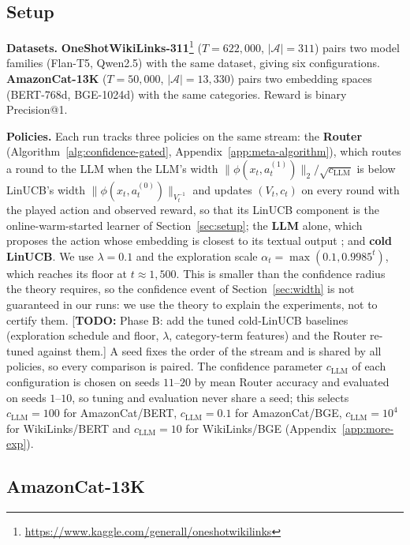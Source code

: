 \documentclass[anon]{alt2027} %
\newcommand{\todo}[1]{\textcolor{red!70!black}{[\textbf{TODO:} #1]}}
\begin{document}
\subsection{Setup}
\label{sec:exp-setup}

\textbf{Datasets.} \textbf{OneShotWikiLinks-311}\footnote{\url{https://www.kaggle.com/generall/oneshotwikilinks}} ($T\!=\!622{,}000$,
$|\mathcal A|\!=\!311$) pairs two model families (Flan-T5, Qwen2.5) with the
same dataset, giving six configurations. \textbf{AmazonCat-13K}
\citep{bhatia2016extreme} ($T\!=\!50{,}000$, $|\mathcal A|\!=\!13{,}330$) pairs two embedding spaces
(BERT-768d, BGE-1024d) with the same categories. Reward is binary
Precision@1.

\textbf{Policies.} Each run tracks three policies on the same stream: the
\textbf{Router} (Algorithm~\ref{alg:confidence-gated},
Appendix~\ref{app:meta-algorithm}), which routes a round to the LLM when the
LLM's width $\|\phi(x_t,a_t^{(1)})\|_2/\sqrt{c_{\mathrm{LLM}}}$ is below LinUCB's width
$\|\phi(x_t,a_t^{(0)})\|_{V_t^{-1}}$ and updates $(V_t,c_t)$ on every round
with the played action and observed reward, so that its LinUCB component is
the online-warm-started learner of Section~\ref{sec:setup}; the \textbf{LLM}
alone, which proposes the action whose embedding is closest to its textual
output \citep{chen2024llmdecision}; and \textbf{cold LinUCB}. We use
$\lambda=0.1$ and the exploration scale $\alpha_t=\max(0.1,0.9985^t)$, which
reaches its floor at $t\approx1{,}500$. This is smaller than the confidence
radius the theory requires, so the confidence event of
Section~\ref{sec:width} is not guaranteed in our runs: we use the theory to
explain the experiments, not to certify them.
\todo{Phase B: add the tuned cold-LinUCB baselines (exploration schedule and
floor, $\lambda$, category-term features) and the Router re-tuned against them.}
A seed fixes the order of the
stream and is shared by all policies, so every comparison is paired. The
confidence parameter $c_{\mathrm{LLM}}$ of each configuration is chosen on seeds $11$--$20$
by mean Router accuracy and evaluated on seeds $1$--$10$, so tuning and
evaluation never share a seed; this selects $c_{\mathrm{LLM}}=100$ for AmazonCat/BERT,
$c_{\mathrm{LLM}}=0.1$ for AmazonCat/BGE, $c_{\mathrm{LLM}}=10^4$ for WikiLinks/BERT and
$c_{\mathrm{LLM}}=10$ for WikiLinks/BGE (Appendix~\ref{app:more-exp}).

\subsection{AmazonCat-13K}
\label{sec:amazon}
\end{document}
